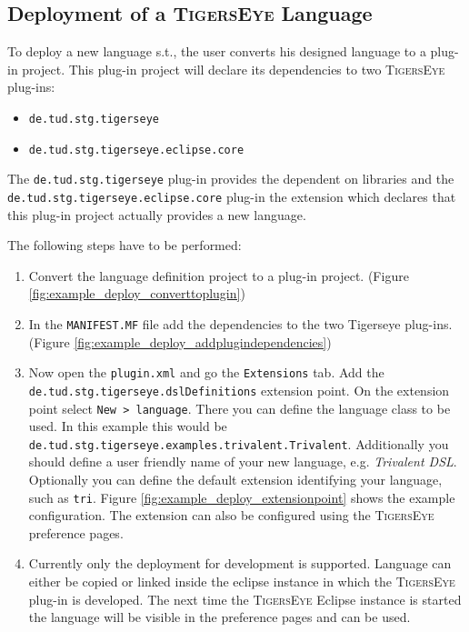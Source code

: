 \documentclass[article,colorback,accentcolor=tud4c]{tudreport}
\newcommand\tiger{%
  \textsc{TigersEye}
}
\begin{document}
  \subsection{Deployment of a \tiger Language}
  
  To deploy a new language s.t., the user converts his designed language to a plug-in project. This plug-in project will declare its dependencies to two \tiger plug-ins:
  \begin{itemize}
   \item \texttt{de.tud.stg.tigerseye}
   \item \texttt{de.tud.stg.tigerseye.eclipse.core}
  \end{itemize}
  The \texttt{de.tud.stg.tigerseye} plug-in provides the dependent on libraries and the \texttt{de.tud.stg.tigerseye.eclipse.core} plug-in the extension which declares that this plug-in project actually provides a new language.
  
  The following steps have to be performed:
  \begin{enumerate}
   \item Convert the language definition project to a plug-in project. (Figure \ref{fig:example_deploy_converttoplugin})
   \item In the \texttt{MANIFEST.MF} file add the dependencies to the two Tigerseye plug-ins. (Figure \ref{fig:example_deploy_addplugindependencies})
   \item Now open the \texttt{plugin.xml} and go the \texttt{Extensions} tab. Add the \texttt{de.tud.stg.tigerseye.dslDefinitions} extension point. On the extension point select \texttt{New > language}. There you can define the language class to be used. In this example this would be \texttt{de.tud.stg.tigerseye.examples.trivalent.Trivalent}. Additionally you should define a user friendly name of your new language, e.g. \emph{Trivalent DSL}. Optionally you can define the default extension identifying your language, such as \texttt{tri}. Figure \ref{fig:example_deploy_extensionpoint} shows the example configuration. The extension can also be configured using the \tiger preference pages.
   \item Currently only the deployment for development is supported. Language can either be copied or linked inside the eclipse instance in which the \tiger plug-in is developed. The next time the \tiger Eclipse instance is started the language will be visible in the preference pages and can be used.
  \end{enumerate}
\end{document}
